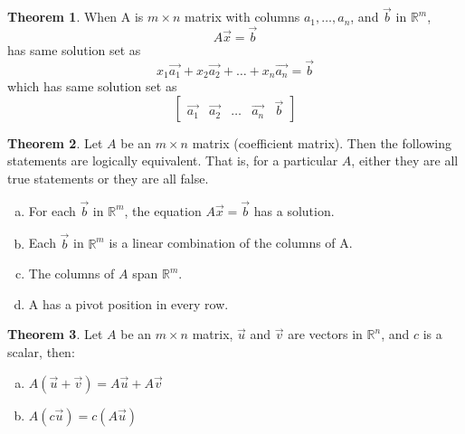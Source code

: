 \documentclass[a4paper,12pt]{article}
\theoremstyle{definition}
\newtheorem{theorem}{Theorem}
\theoremstyle{definition}
\newcommand{\mateq}[3]{#1#2 = #3}
\newcommand{\mateqaxb}{\mateq{A}{\vec{x}}{\vec{b}}}
\begin{document}
	\begin{theorem}
		\label{thm:A-x-b-thm}
		When A is $m \times n$ matrix with columns $a_1,\ldots,a_n$, and $\vec{b}$ in $\mathbb{R}^m$,
		\begin{equation*}
			\mateqaxb
		\end{equation*}
		has same solution set as
		\begin{equation*}
			x_1\vec{a_1} + x_2\vec{a_2} + \ldots + x_n\vec{a_n} = \vec{b}
		\end{equation*}
		which has same solution set as 
		\begin{equation*}
			\begin{bmatrix}
				\vec{a_1} & \vec{a_2} & \ldots & \vec{a_n} & \vec{b}
			\end{bmatrix}
		\end{equation*}
	\end{theorem}
	
	\begin{theorem}
		\label{thm:A-x-b-relation-thm}
		Let $A$ be an $m \times n$ matrix (coefficient matrix). Then the following statements are logically equivalent.
		That is, for a particular $A$, either they are all true statements or they are all false.
		\begin{enumerate}[a.]
			\item For each $\vec{b}$ in $\mathbb{R} ^ m$, the equation $A\vec{x} = \vec{b}$ has a solution.
			
			\item Each $\vec{b}$ in $\mathbb{R} ^ m$ is a linear combination of the columns of A.
			
			\item The columns of $A$ span $\mathbb{R} ^ m$.
			
			\item A has a pivot position in every row.
		\end{enumerate}
	\end{theorem}
	
	\begin{theorem}
		\label{thm:A-x-b-props}
		Let $A$ be an $m \times n$ matrix, $\vec{u}$ and $\vec{v}$ are vectors in $\mathbb{R}^n$, and $c$ is a scalar, then:
		
		\begin{enumerate}[a.]
			\item $A(\vec{u} + \vec{v}) = A\vec{u} + A\vec{v}$
			
			\item $A(c\vec{u}) = c(A\vec{u})$
		\end{enumerate}
	\end{theorem}
	
\end{document}
